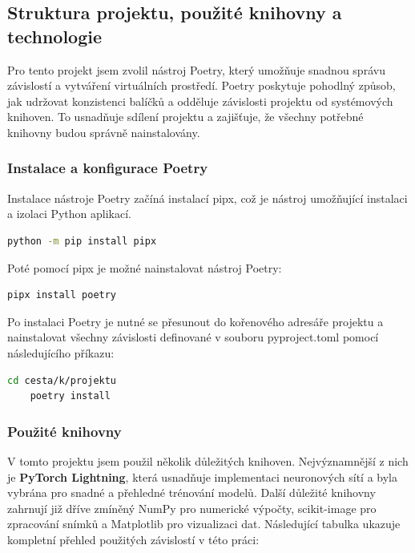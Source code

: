 \documentclass[male,czech,api_ing]{thesis}
\begin{document}
\subsection{Struktura projektu, použité knihovny a technologie}
Pro tento projekt jsem zvolil nástroj Poetry, který umožňuje snadnou správu závislostí a vytváření virtuálních prostředí. Poetry poskytuje pohodlný způsob, jak udržovat konzistenci balíčků a odděluje závislosti projektu od systémových knihoven. To usnadňuje sdílení projektu a zajišťuje, že všechny potřebné knihovny budou správně nainstalovány.

\subsubsection{Instalace a konfigurace Poetry}
Instalace nástroje Poetry začíná instalací pipx, což je nástroj umožňující instalaci a izolaci Python aplikací. 

\begin{lstlisting}[language=bash, caption={Instalace pipx}]
    python -m pip install pipx
\end{lstlisting}

Poté pomocí pipx je možné nainstalovat nástroj Poetry:

\begin{lstlisting}[language=bash, caption={Instalace Poetry}]
    pipx install poetry
\end{lstlisting}

Po instalaci Poetry je nutné se přesunout do kořenového adresáře projektu a nainstalovat všechny závislosti definované v souboru pyproject.toml pomocí následujícího příkazu:

\begin{lstlisting}[language=bash, caption={Instalace virtuálního prostředí a knihoven}]
    cd cesta/k/projektu
    poetry install
\end{lstlisting}

\subsubsection{Použité knihovny}
V tomto projektu jsem použil několik důležitých knihoven. Nejvýznamnější z nich je \textbf{PyTorch Lightning}, která usnadňuje implementaci neuronových sítí a byla vybrána pro snadné a přehledné trénování modelů. Další důležité knihovny zahrnují již dříve zmíněný NumPy pro numerické výpočty, scikit-image pro zpracování snímků a Matplotlib pro vizualizaci dat. Následující tabulka ukazuje kompletní přehled použitých závislostí v této práci:
\end{document}
